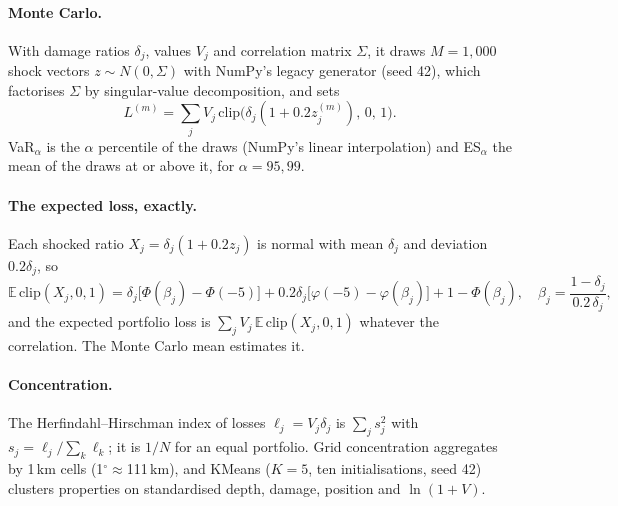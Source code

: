 \documentclass[11pt,a4paper]{article}
\begin{document}
\paragraph{Monte Carlo.} With damage ratios $\delta_j$, values $V_j$ and correlation
matrix $\Sigma$, it draws $M=1{,}000$ shock vectors $z\sim N(0,\Sigma)$ with NumPy's
legacy generator (seed 42), which factorises $\Sigma$ by singular-value decomposition,
and sets
\begin{equation}
    L^{(m)} = \sum_j V_j\, \mathrm{clip}\bigl(\delta_j(1+0.2z_j^{(m)}),\,0,\,1\bigr).
    \label{eq:mc}
\end{equation}
VaR$_\alpha$ is the $\alpha$ percentile of the draws (NumPy's linear interpolation) and
ES$_\alpha$ the mean of the draws at or above it, for $\alpha=95,99$.

\paragraph{The expected loss, exactly.} Each shocked ratio $X_j=\delta_j(1+0.2z_j)$ is
normal with mean $\delta_j$ and deviation $0.2\delta_j$, so
\begin{equation}
    \mathbb{E}\,\mathrm{clip}(X_j,0,1) = \delta_j\bigl[\Phi(\beta_j)-\Phi(-5)\bigr]
    + 0.2\delta_j\bigl[\varphi(-5)-\varphi(\beta_j)\bigr] + 1-\Phi(\beta_j),\quad
    \beta_j = \frac{1-\delta_j}{0.2\,\delta_j},
    \label{eq:el}
\end{equation}
and the expected portfolio loss is $\sum_jV_j\,\mathbb{E}\,\mathrm{clip}(X_j,0,1)$ whatever
the correlation. The Monte Carlo mean estimates it.

\paragraph{Concentration.} The Herfindahl--Hirschman index of losses
$\ell_j=V_j\delta_j$ is $\sum_js_j^2$ with $s_j=\ell_j/\sum_k\ell_k$; it is $1/N$ for an
equal portfolio. Grid concentration aggregates by 1\,km cells (1$^\circ\approx$111\,km),
and KMeans ($K=5$, ten initialisations, seed 42) clusters properties on standardised
depth, damage, position and $\ln(1+V)$.

\mkminputs
\end{document}
